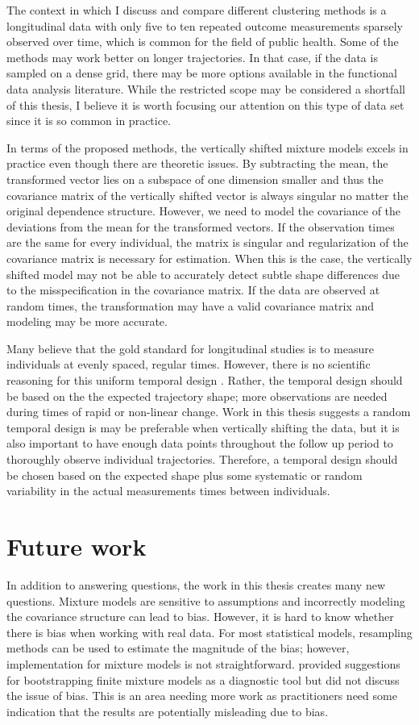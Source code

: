 The context in which I discuss and compare different clustering methods is a longitudinal data with only five to ten repeated outcome measurements sparsely observed over time, which is common for the field of public health. Some of the methods may work better on longer trajectories. In that case, if the data is sampled on a dense grid, there may be more options available in the functional data analysis literature. While the restricted scope may be considered a shortfall of this thesis, I believe it is worth focusing our attention on this type of data set since it is so common in practice.

In terms of the proposed methods, the vertically shifted mixture models excels in practice even though there are theoretic issues. By subtracting the mean, the transformed vector lies on a subspace of one dimension smaller and thus the covariance matrix of the vertically shifted vector is always singular no matter the original dependence structure. However, we need to model the covariance of the deviations from the mean for the transformed vectors. If the observation times are the same for every individual, the matrix is singular and regularization of the covariance matrix is necessary for estimation. When this is the case, the vertically shifted model may not be able to accurately detect subtle shape differences due to the misspecification in the covariance matrix. If the data are observed at random times, the transformation may have a valid covariance matrix and modeling may be more accurate. 

Many believe that the gold standard for longitudinal studies is to measure individuals at evenly spaced, regular times. However, there is no scientific reasoning for this uniform temporal design \cite{collins2006}. Rather, the temporal design should be based on the the expected trajectory shape; more observations are needed during times of rapid or non-linear change. Work in this thesis suggests a random temporal design is may be preferable when vertically shifting the data, but it is also important to have enough data points throughout the follow up period to thoroughly observe individual trajectories. Therefore, a temporal design should be chosen based on the expected shape plus some systematic or random variability in the actual measurements times between individuals. 

\section{Future work}
In addition to answering questions, the work in this thesis creates many new questions. Mixture models are sensitive to assumptions and incorrectly modeling the covariance structure can lead to bias. However, it is hard to know whether there is bias when working with real data. For most statistical models, resampling methods can be used to estimate the magnitude of the bias; however, implementation for mixture models is not straightforward. \textcite{grun2004} provided suggestions for bootstrapping finite mixture models as a diagnostic tool but did not discuss the issue of bias. This is an area needing more work as practitioners need some indication that the results are potentially misleading due to bias. 

